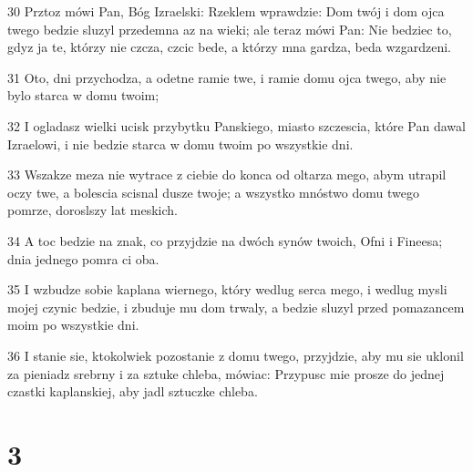 \par 30 Prztoz mówi Pan, Bóg Izraelski: Rzeklem wprawdzie: Dom twój i dom ojca twego bedzie sluzyl przedemna az na wieki; ale teraz mówi Pan: Nie bedziec to, gdyz ja te, którzy nie czcza, czcic bede, a którzy mna gardza, beda wzgardzeni.
\par 31 Oto, dni przychodza, a odetne ramie twe, i ramie domu ojca twego, aby nie bylo starca w domu twoim;
\par 32 I ogladasz wielki ucisk przybytku Panskiego, miasto szczescia, które Pan dawal Izraelowi, i nie bedzie starca w domu twoim po wszystkie dni.
\par 33 Wszakze meza nie wytrace z ciebie do konca od oltarza mego, abym utrapil oczy twe, a bolescia scisnal dusze twoje; a wszystko mnóstwo domu twego pomrze, doroslszy lat meskich.
\par 34 A toc bedzie na znak, co przyjdzie na dwóch synów twoich, Ofni i Fineesa; dnia jednego pomra ci oba.
\par 35 I wzbudze sobie kaplana wiernego, który wedlug serca mego, i wedlug mysli mojej czynic bedzie, i zbuduje mu dom trwaly, a bedzie sluzyl przed pomazancem moim po wszystkie dni.
\par 36 I stanie sie, ktokolwiek pozostanie z domu twego, przyjdzie, aby mu sie uklonil za pieniadz srebrny i za sztuke chleba, mówiac: Przypusc mie prosze do jednej czastki kaplanskiej, aby jadl sztuczke chleba.

\chapter{3}

